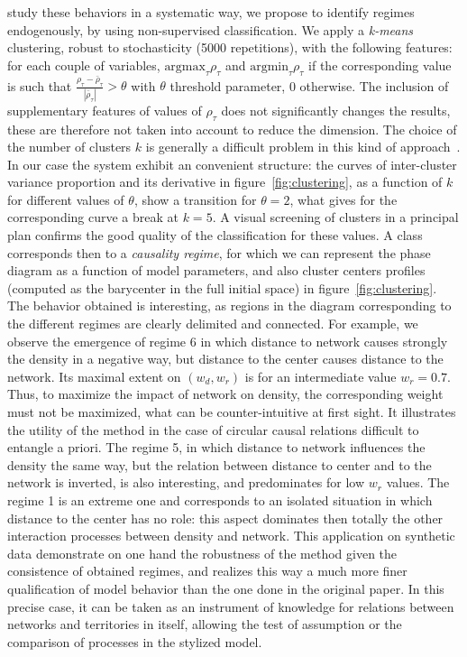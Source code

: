 \documentclass[english]{./sageo}
\begin{document}
study these behaviors in a systematic way, we propose to identify regimes endogenously, by using non-supervised classification. We apply a \emph{k-means} clustering, robust to stochasticity (5000 repetitions), with the following features: for each couple of variables, $\textrm{argmax}_{\tau} \rho_{\tau}$ and $\textrm{argmin}_{\tau} \rho_{\tau}$ if the corresponding value is such that $\frac{\rho_{\tau}-\bar{\rho}_{\tau}}{\left|\bar{\rho}_{\tau}\right|} > \theta$ with $\theta$ threshold parameter, 0 otherwise. The inclusion of supplementary features of values of $\rho_{\tau}$ does not significantly changes the results, these are therefore not taken into account to reduce the dimension. The choice of the number of clusters $k$ is generally a difficult problem in this kind of approach~\cite{hamerly2003learning}. In our case the system exhibit an convenient structure: the curves of inter-cluster variance proportion and its derivative in figure~\ref{fig:clustering}, as a function of $k$ for different values of $\theta$, show a transition for $\theta = 2$, what gives for the corresponding curve a break at $k=5$. A visual screening of clusters in a principal plan confirms the good quality of the classification for these values. A class corresponds then to a \emph{causality regime}, for which we can represent the phase diagram as a function of model parameters, and also cluster centers profiles (computed as the barycenter in the full initial space) in figure~\ref{fig:clustering}. The behavior obtained is interesting, as regions in the diagram corresponding to the different regimes are clearly delimited and connected. For example, we observe the emergence of regime 6 in which distance to network causes strongly the density in a negative way, but distance to the center causes distance to the network. Its maximal extent on $(w_d,w_r)$ is for an intermediate value $w_r=0.7$. Thus, to maximize the impact of network on density, the corresponding weight must not be maximized, what can be counter-intuitive at first sight. It illustrates the utility of the method in the case of circular causal relations difficult to entangle a priori. The regime 5, in which distance to network influences the density the same way, but the relation between distance to center and to the network is inverted, is also interesting, and predominates for low $w_r$ values. The regime 1 is an extreme one and corresponds to an isolated situation in which distance to the center has no role: this aspect dominates then totally the other interaction processes between density and network. This application on synthetic data demonstrate on one hand the robustness of the method given the consistence of obtained regimes, and realizes this way a much more finer qualification of model behavior than the one done in the original paper. In this precise case, it can be taken as an instrument of knowledge for relations between networks and territories in itself, allowing the test of assumption or the comparison of processes in the stylized model.
\end{document}

